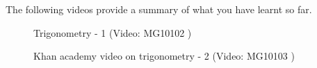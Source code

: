 The following videos provide a summary of what you have learnt so far.
\setcounter{subfigure}{0}
\begin{figure}[H] %
\textnormal{Trigonometry - 1}\vspace{.1in} \nopagebreak
\label{m39408*yt-media}\label{m39408*yt-video}
 { (Video:  MG10102 )}
\vspace{2pt}
\vspace{.1in}
\end{figure}       \par \label{m39408*eip-33}
\setcounter{subfigure}{0}
\begin{figure}[H] %
\textnormal{Khan academy video on trigonometry - 2}\vspace{.1in} \nopagebreak
\label{m39408*yt-media2}\label{m39408*yt-video2}
 { (Video:  MG10103 )}
\vspace{2pt}
\vspace{.1in}
\end{figure}       


